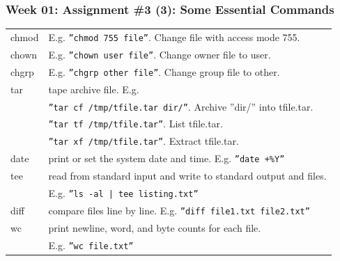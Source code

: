 \documentclass[xcolor=table, notheorems, hyperref={pdfpagelabels=false}]{beamer}
\begin{document}
\begin{frame}
\frametitle{Week 01: Assignment \#3 (3): Some Essential Commands}
\begin{tabular}{l l}
\hline
chmod  & E.g. \texttt{''chmod 755 file''}. Change file with access mode 755.    \\
chown  & E.g. \texttt{''chown user file''}. Change owner file to user.          \\
chgrp  & E.g. \texttt{''chgrp other file''}. Change group file to other.        \\
tar    & tape archive file. E.g.                                                \\
       & \texttt{''tar cf /tmp/tfile.tar  dir/''}. Archive ''dir/'' into tfile.tar. \\
       & \texttt{''tar tf /tmp/tfile.tar''}. List tfile.tar.                   \\
       & \texttt{''tar xf /tmp/tfile.tar''}. Extract tfile.tar.                \\
date   & print or set the system date and time. E.g. \texttt{''date +\%Y''}     \\
tee    & read from standard input and write to standard output and files.      \\
       & E.g. \texttt{''ls -al | tee listing.txt''}                             \\
diff   & compare files line by line. E.g. \texttt{''diff file1.txt file2.txt''} \\
wc     & print newline, word, and byte counts for each file.                   \\
       & E.g. \texttt{''wc file.txt''}                                          \\
\hline
\end{tabular}
\end{frame}

\end{document}
